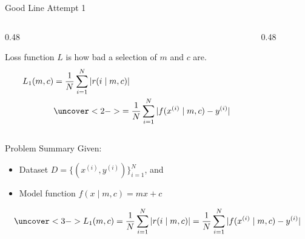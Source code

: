 \documentclass[aspectratio=169,t]{beamer}
\begin{document}
\begin{frame}{Good Line Attempt 1}
  \begin{columns}[T,onlytextwidth]
    \begin{column}{0.48\textwidth}
    \begin{definition}
        Loss function \(L\) is how bad a selection of \(m\) and \(c\) are.
        \begin{align*}
            L_1(m, c) &= \frac{1}{N}\sum_{i=1}^N|r(i\mid m, c)|\\
            &\uncover<2->{= \frac{1}{N}\sum_{i=1}^N|f(x^{(i)}\mid m, c) - y^{(i)}|}
        \end{align*}
    \end{definition}
    \end{column}
    \begin{column}{0.48\textwidth}
    \end{column}
  \end{columns}
  \medskip
\end{frame}
\begin{frame}{Problem Summary}
    Given:
    \begin{itemize}
        \item Dataset \(D = \{(x^{(i)}, y^{(i)})\}_{i = 1}^N\), and
        \item<2-> Model function \(f(x\mid m, c) = mx + c\)
    \end{itemize}
    \[\begingroup\uncover<3->{L_1(m, c) = \frac{1}{N}\sum_{i = 1}^N|r(i\mid m, c)| = \frac{1}{N}\sum_{i = 1}^N|f(x^{(i)}\mid m, c) - y^{(i)}|}\endgroup\]
\end{frame}
\end{document}
